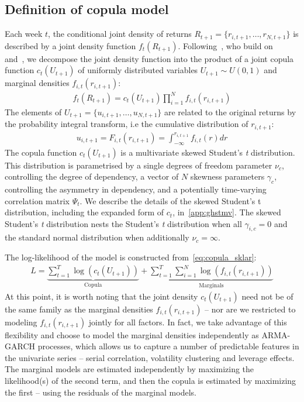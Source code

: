 
\subsection{Definition of copula model} %
\label{sub:definition_of_copula_model}

Each week $t$, the conditional joint density of returns $R_{t+1} = \{r_{i,t+1},\ldots,r_{N,t+1}\}$ is described by a joint density function $f_t(R_{t+1})$. Following~\textcite{ChristoffersenErrunzaJacobLanglois2012}, who build on~\textcite{Patton2006} and~\textcite{Sklar1959}, we decompose the joint density function into the product of a joint copula function $c_t(U_{t+1})$ of uniformly distributed variables $U_{t+1} \sim U(0, 1)$ and marginal densities $f_{i,t}(r_{i,t+1})$:
\begin{align}
  f_t(R_{t+1}) =
    c_t(U_{t+1}) \prod^N_{i=1} f_{i,t}(r_{i,t+1})
  \label{eq:copula_sklar}
\end{align}
The elements of $U_{t+1} = \{u_{i,t+1},\ldots,u_{N,t+1}\}$ are related to the original returns by the probability integral transform, i.e the cumulative distribution of $r_{i,t+1}$:
\begin{align}
  u_{i,t+1} = F_{i,t}(r_{i,t+1}) = \int_{-\infty}^{r_{i,t+1}} f_{i,t}(r)dr
\end{align}
The copula function $c_t(U_{t+1})$ is a multivariate skewed Student's \emph{t} distribution. This distribution is parametrised by a single degrees of freedom parameter $\nu_c$, controlling the degree of dependency, a vector of $N$ skewness parameters $\gamma_c$, controlling the asymmetry in dependency, and a potentially time-varying correlation matrix $\Psi_{t}$. We describe the details of the skewed Student's t distribution, including the expanded form of $c_t$, in~\autoref{app:ghstmv}. The skewed Student's \emph{t} distribution nests the Student's \emph{t} distribution when all $\gamma_{i,c} = 0$ and the standard normal distribution when additionally $\nu_c = \infty$.

The log-likelihood of the model is constructed from~\autoref{eq:copula_sklar}:
\begin{align}
  L =
    \underbrace{\sum_{t=1}^T \log(c_t(U_{t+1}))}_\text{Copula} +
    \underbrace{\sum_{t=1}^T \sum_{i=1}^N \log(f_{i,t}(r_{i,t+1}))}_\text{Marginals}
\end{align}
At this point, it is worth noting that the joint density $c_t(U_{t+1})$ need not be of the same family as the marginal densities $f_{i,t}(r_{i,t+1})$ -- nor are we restricted to modeling $f_{i,t}(r_{i,t+1})$ jointly for all factors. In fact, we take advantage of this flexibility and choose to model the marginal densities independently as ARMA-GARCH processes, which allows us to capture a number of predictable features in the univariate series -- serial correlation, volatility clustering and leverage effects. The marginal models are estimated independently by maximizing the likelihood(s) of the second term, and then the copula is estimated by maximizing the first -- using the residuals of the marginal models.

